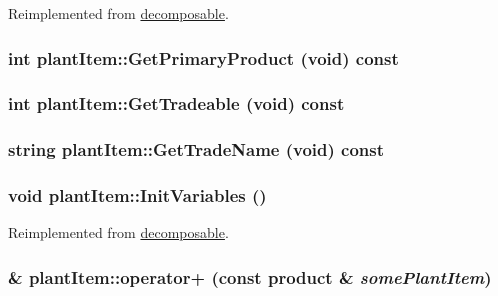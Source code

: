 Reimplemented from \hyperlink{classdecomposable_ab15f1f4e93e58810887029648be0ec31}{decomposable}.\hypertarget{classplant_item_a0bce13899dbeeb3eb5be82d42ea9cf93}{
\subsubsection[{GetPrimaryProduct}]{\setlength{\rightskip}{0pt plus 5cm}int plantItem::GetPrimaryProduct (void) const}}
\label{classplant_item_a0bce13899dbeeb3eb5be82d42ea9cf93}
\hypertarget{classplant_item_a699f90b4fdbccc1f533ebe40b6865c10}{
\subsubsection[{GetTradeable}]{\setlength{\rightskip}{0pt plus 5cm}int plantItem::GetTradeable (void) const}}
\label{classplant_item_a699f90b4fdbccc1f533ebe40b6865c10}
\hypertarget{classplant_item_a13e0fffda4f4b06bf2227812e810197e}{
\subsubsection[{GetTradeName}]{\setlength{\rightskip}{0pt plus 5cm}string plantItem::GetTradeName (void) const}}
\label{classplant_item_a13e0fffda4f4b06bf2227812e810197e}
\hypertarget{classplant_item_a68b971164b0ea870d6d14c5b53ad8223}{
\subsubsection[{InitVariables}]{\setlength{\rightskip}{0pt plus 5cm}void plantItem::InitVariables ()}}
\label{classplant_item_a68b971164b0ea870d6d14c5b53ad8223}


Reimplemented from \hyperlink{classdecomposable_aabfa1610321f138dff27b27e074cf9ea}{decomposable}.\hypertarget{classplant_item_aee9a9da7f6a40551ff0e172561d6a881}{
\subsubsection[{operator+}]{ \& plantItem::operator+ (const {\bf product} \& {\em somePlantItem})}}
\label{classplant_item_aee9a9da7f6a40551ff0e172561d6a881}


